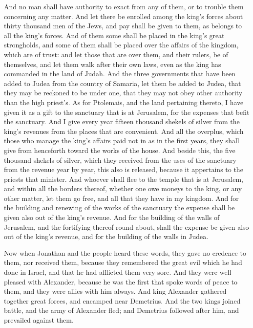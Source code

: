 {And no man shall have authority to exact from any of them, or to trouble them concerning any matter.
And let there be enrolled among the king’s forces about thirty thousand men of the Jews, and pay shall be given to them, as belongs to all the king’s forces.
And of them some shall be placed in the king’s great strongholds, and some of them shall be placed over the affairs of the kingdom, which are of trust: and let those that are over them, and their rulers, be of themselves, and let them walk after their own laws, even as the king has commanded in the land of Judah.
And the three governments that have been added to Judea from the country of Samaria, let them be added to Judea, that they may be reckoned to be under one, that they may not obey other authority than the high priest’s.
As for Ptolemais, and the land pertaining thereto, I have given it as a gift to the sanctuary that is at Jerusalem, for the expenses that befit the sanctuary.
And I give every year fifteen thousand shekels of silver from the king’s revenues from the places that are convenient.
And all the overplus, which those who manage the king’s affairs paid not in as in the first years, they shall give from henceforth toward the works of the house.
And beside this, the five thousand shekels of silver, which they received from the uses of the sanctuary from the revenue year by year, this also is released, because it appertains to the priests that minister.
And whoever shall flee to the temple that is at Jerusalem, and
{} within all the borders thereof, whether one owe moneys to the king, or any other matter, let them go free, and all that they have in my kingdom.
And for the building and renewing of the works of the sanctuary the expense shall be given also out of the king’s revenue.
And for the building of the walls of Jerusalem, and the fortifying thereof round about, shall the expense be given also out of the king’s revenue, and for the building of the walls in Judea.
\par }{\PP {}Now when Jonathan and the people heard these words, they gave no credence to them, nor received them, because they remembered the great evil which he had done in Israel, and that he had afflicted them very sore.
And they were well pleased with Alexander, because he was the first that spoke words of peace to them, and they were allies with him always.
And king Alexander gathered together great forces, and encamped near Demetrius.
And the two kings joined battle, and the army of Alexander fled; and Demetrius followed after him, and prevailed against them.
}
